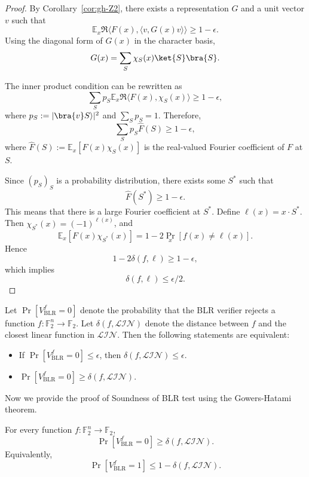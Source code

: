 \begin{proof}
    By Corollary~\ref{cor:gh-Z2}, there exists a representation $G$ and a unit vector $v$ such that
    \[
        \mathbb{E}_{x} \Re \langle F(x), \langle v, G(x)v\rangle \rangle \ge 1 - \epsilon.
    \]
    Using the diagonal form of $G(x)$ in the character basis,
    \[
        G(x) = \sum_S \chi_S(x) \ket{S}\bra{S}.
    \]

    The inner product condition can be rewritten as
    \[
       \sum_{S} p_S  \mathbb{E}_{x} \Re \langle F(x), \chi_S(x) \rangle \ge 1 - \epsilon,
    \]
        where $p_S := |\bra{v}S\rangle|^2$ and $\sum_S p_S = 1$.
    Therefore,
    \[
        \sum_S p_S \widehat{F}(S) \ge 1 - \epsilon,
    \]
    where $\widehat{F}(S):=\mathbb{E}_x[F(x)\chi_S(x)]$ is the real-valued Fourier coefficient of $F$ at $S$.

    Since $(p_S)_S$ is a probability distribution, there exists some $S^*$ such that
    \[
        \widehat{F}(S^*) \ge 1 - \epsilon.
    \]
    This means that there is a large Fourier coefficient at $S^*$.
    Define $\ell(x)=x\cdot S^*$. Then $\chi_{S^*}(x)=(-1)^{\ell(x)}$, and
    \[
        \mathbb{E}_x[F(x)\chi_{S^*}(x)] = 1 - 2\Pr_x[f(x)\neq \ell(x)].
    \]
    Hence
    \[
        1 - 2\delta(f,\ell) \ge 1 - \epsilon,
    \]
    which implies
    \[
        \delta(f,\ell) \le \epsilon/2.
    \]
\end{proof}

\begin{proposition}\label{prop:equiv_blr_z2}
    Let $ \Pr[V_{\text{BLR}}^f=0]$ denote the probability that the BLR verifier rejects a function $f: \mathbb{F}_2^n \to \mathbb{F}_2$.
    Let $\delta(f, \mathcal{LIN})$ denote the distance between $f$ and the closest linear function in $\mathcal{LIN}$.
    Then the following statements are equivalent:
    \begin{itemize}
        \item If $\Pr[V_{\text{BLR}}^f=0] \leq \epsilon$, then $\delta(f, \mathcal{LIN}) \leq \epsilon$.
        \item $\Pr[V_{\text{BLR}}^f=0] \geq \delta(f, \mathcal{LIN})$.
    \end{itemize}
\end{proposition}    


Now we provide the proof of Soundness of BLR test using the Gowers-Hatami theorem.

\begin{theorem}
\label{thm:z2-blr-soundness}
For every function $f:\mathbb{F}_2^n\to\mathbb{F}_2$,
\[
    \Pr[V_{\text{BLR}}^f=0] \ge \delta(f,\mathcal{LIN}).
\]
Equivalently,
\[
    \Pr[V_{\text{BLR}}^f=1] \le 1-\delta(f,\mathcal{LIN}).
\]
\end{theorem}

